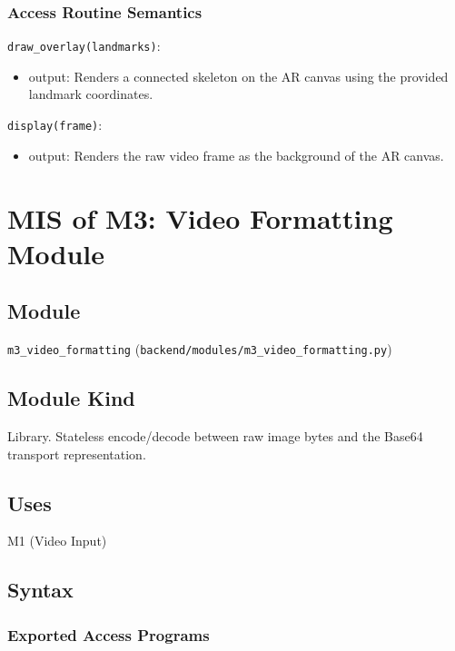 \documentclass[12pt, titlepage]{article}
\begin{document}
\subsubsection{Access Routine Semantics}

\noindent \texttt{draw\_overlay(landmarks)}:
\begin{itemize}
  \item output: Renders a connected skeleton on the AR canvas using the provided landmark coordinates.
\end{itemize}

\noindent \texttt{display(frame)}:
\begin{itemize}
  \item output: Renders the raw video frame as the background of the AR canvas.
\end{itemize}

\newpage

\section{MIS of M3: Video Formatting Module} \label{M3}

\subsection{Module}
\texttt{m3\_video\_formatting} (\texttt{backend/modules/m3\_video\_formatting.py})

\subsection{Module Kind}
Library. Stateless encode/decode between raw image bytes and the
Base64 transport representation.

\subsection{Uses}
M1 (Video Input)

\subsection{Syntax}

\subsubsection{Exported Access Programs}
\end{document}
